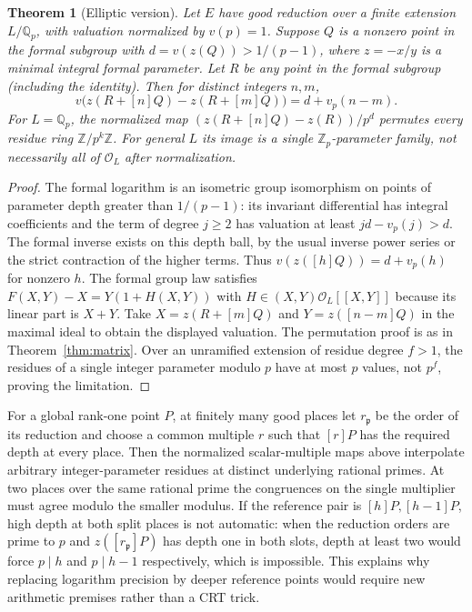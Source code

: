\documentclass[11pt]{article}
\newtheorem{theorem}{Theorem}[section]
\newcommand{\Q}{\mathbb Q}\newcommand{\Z}{\mathbb Z}\newcommand{\N}{\mathbb N}
\begin{document}
\begin{theorem}[Elliptic version]\label{thm:ellinterp}
Let $E$ have good reduction over a finite extension $L/\Q_p$, with
valuation normalized by $v(p)=1$. Suppose $Q$ is a nonzero point in
the formal subgroup with $d=v(z(Q))>1/(p-1)$, where $z=-x/y$ is a
minimal integral formal parameter. Let $R$ be any point in the formal
subgroup (including the identity). Then for distinct integers $n,m$,
\[
 v\bigl(z(R+[n]Q)-z(R+[m]Q)\bigr)=d+v_p(n-m).
\]
For $L=\Q_p$, the normalized map
$(z(R+[n]Q)-z(R))/p^d$ permutes every residue ring $\Z/p^k\Z$.
For general $L$ its image is a single $\Z_p$-parameter family, not
necessarily all of $\mathcal O_L$ after normalization.
\end{theorem}
\begin{proof}
The formal logarithm is an isometric group isomorphism on points of
parameter depth greater than $1/(p-1)$: its invariant differential
has integral coefficients and the term of degree $j\ge2$ has valuation
at least $jd-v_p(j)>d$. The formal inverse exists on this depth
ball, by the usual inverse power series or the strict contraction
of the higher terms. Thus $v(z([h]Q))=d+v_p(h)$ for nonzero $h$.
The formal group law satisfies $F(X,Y)-X=Y(1+H(X,Y))$ with
$H\in (X,Y)\mathcal O_L[[X,Y]]$ because its linear part is $X+Y$.
Take $X=z(R+[m]Q)$ and $Y=z([n-m]Q)$ in the maximal ideal to
obtain the displayed valuation. The permutation proof is as in
Theorem~\ref{thm:matrix}. Over an unramified extension of residue
degree $f>1$, the residues of a single integer parameter modulo $p$
have at most $p$ values, not $p^f$, proving the limitation.
\end{proof}

For a global rank-one point $P$, at finitely many good places let
$r_\mathfrak p$ be the order of its reduction and choose a common
multiple $r$ such that $[r]P$ has the required depth at every place.
Then the normalized scalar-multiple maps above interpolate arbitrary
integer-parameter residues at distinct underlying rational primes.
At two places over the same rational prime the congruences on the
single multiplier must agree modulo the smaller modulus. If the
reference pair is $[h]P,[h-1]P$, high depth at both split places
is not automatic: when the reduction orders are prime to $p$ and
$z([r_\mathfrak p]P)$ has depth one in both slots, depth at least two
would force $p\mid h$ and $p\mid h-1$ respectively, which is impossible.
This explains why replacing logarithm precision by deeper reference
points would require new arithmetic premises rather than a CRT trick.
\end{document}
